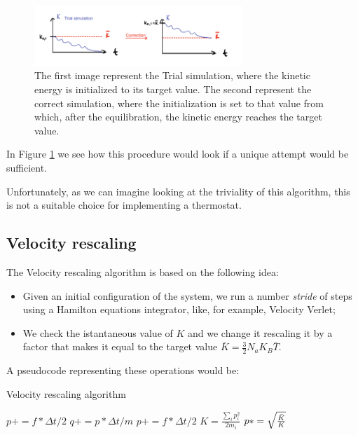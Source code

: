 \begin{figure}
    \centering
    \includegraphics[width=0.7\textwidth]{Thermostats/images/Trial and error.PNG}
    \caption{The first image represent the Trial simulation, where the kinetic energy is initialized to its target value. The second represent the correct simulation, where the initialization is set to that value from which, after the equilibration, the kinetic energy reaches the target value.}
    \label{fig:trial and error}
\end{figure}

In Figure \ref{fig:trial and error} we see how this procedure would look if a unique attempt would be sufficient.

Unfortunately, as we can imagine looking at the triviality of this algorithm, this is not a suitable choice for implementing a thermostat.

\subsection{Velocity rescaling}
The Velocity rescaling algorithm is based on the following idea:
\begin{itemize}
    \item Given an initial configuration of the system, we run a number \textit {stride} of steps using a Hamilton equations integrator, like, for example, Velocity Verlet;
    \item We check the istantaneous value of $K$ and we change it rescaling it by a factor that makes it equal to the target value $\bar K=\frac{3}{2}N_a K_B \bar T$.
\end{itemize}

A pseudocode representing these operations would be:
\begin{algorithm}[H]\label{velocity_rescaling}
			\caption{Velocity rescaling algorithm}
			\begin{algorithmic}[1]
    				\State $p+=f*\Delta t/2$
    				\State $q+=p*\Delta t/m$
    				\State $p+=f*\Delta t/2$
    				    \State $K= \frac{\sum_{i}{p_i^2}}{{2m_i}}$
    				    \State $p* = \sqrt{\frac{\Bar{K}}{K}}$
    				\EndIf
				\EndFor
			\end{algorithmic}
		\end{algorithm}

